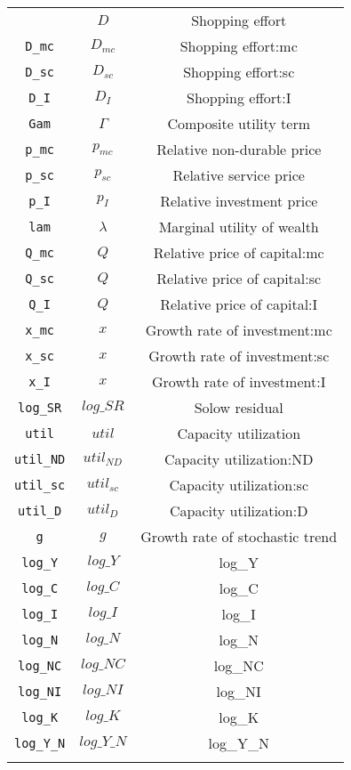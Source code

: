 \begin{center}
\begin{longtable}{ccc}
{\texttt{D} & ${D}$ & Shopping effort\\
\texttt{D\_mc} & ${D_{mc}}$ & Shopping effort:mc\\
\texttt{D\_sc} & ${D_{sc}}$ & Shopping effort:sc\\
\texttt{D\_I} & ${D_I}$ & Shopping effort:I\\
\texttt{Gam} & ${\Gamma}$ & Composite utility term\\
\texttt{p\_mc} & ${p_{mc}}$ & Relative non-durable price\\
\texttt{p\_sc} & ${p_{sc}}$ & Relative service price\\
\texttt{p\_I} & ${p_I}$ & Relative investment price\\
\texttt{lam} & ${\lambda}$ & Marginal utility of wealth\\
\texttt{Q\_mc} & ${Q}$ & Relative price of capital:mc\\
\texttt{Q\_sc} & ${Q}$ & Relative price of capital:sc\\
\texttt{Q\_I} & ${Q}$ & Relative price of capital:I\\
\texttt{x\_mc} & ${x}$ & Growth rate of investment:mc\\
\texttt{x\_sc} & ${x}$ & Growth rate of investment:sc\\
\texttt{x\_I} & ${x}$ & Growth rate of investment:I\\
\texttt{log\_SR} & $log\_SR$ & Solow residual\\
\texttt{util} & ${util}$ & Capacity utilization\\
\texttt{util\_ND} & ${util_{ND}}$ & Capacity utilization:ND\\
\texttt{util\_sc} & ${util_{sc}}$ & Capacity utilization:sc\\
\texttt{util\_D} & ${util_D}$ & Capacity utilization:D\\
\texttt{g} & ${g}$ & Growth rate of stochastic trend\\
\texttt{log\_Y} & $log\_Y$ & log\_Y\\
\texttt{log\_C} & $log\_C$ & log\_C\\
\texttt{log\_I} & $log\_I$ & log\_I\\
\texttt{log\_N} & $log\_N$ & log\_N\\
\texttt{log\_NC} & $log\_NC$ & log\_NC\\
\texttt{log\_NI} & $log\_NI$ & log\_NI\\
\texttt{log\_K} & $log\_K$ & log\_K\\
\texttt{log\_Y\_N} & $log\_Y\_N$ & log\_Y\_N\\
}
\end{longtable}
\end{center}
